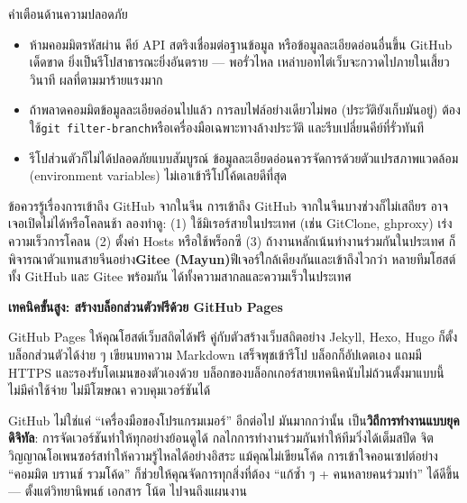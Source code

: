 \begin{tcbwarn}{คำเตือนด้านความปลอดภัย}
\begin{itemize}
  \item ห้ามคอมมิตรหัสผ่าน คีย์ API สตริงเชื่อมต่อฐานข้อมูล หรือข้อมูลละเอียดอ่อนอื่นขึ้น GitHub เด็ดขาด ยิ่งเป็นรีโปสาธารณะยิ่งอันตราย — พอรั่วไหล เหล่าบอทไต่เว็บจะกวาดไปภายในเสี้ยววินาที ผลที่ตามมาร้ายแรงมาก
  \item ถ้าพลาดคอมมิตข้อมูลละเอียดอ่อนไปแล้ว การลบไฟล์อย่างเดียวไม่พอ (ประวัติยังเก็บมันอยู่) ต้องใช้\texttt{git filter-\allowbreak branch}หรือเครื่องมือเฉพาะทางล้างประวัติ และรีบเปลี่ยนคีย์ที่รั่วทันที
  \item รีโปส่วนตัวก็ไม่ได้ปลอดภัยแบบสัมบูรณ์ ข้อมูลละเอียดอ่อนควรจัดการด้วยตัวแปรสภาพแวดล้อม (environment variables) ไม่เอาเข้ารีโปโค้ดเลยดีที่สุด
\end{itemize}

\end{tcbwarn}

\begin{tcbinfo}{ข้อควรรู้เรื่องการเข้าถึง GitHub จากในจีน}
การเข้าถึง GitHub จากในจีนบางช่วงก็ไม่เสถียร อาจเจอเปิดไม่ได้หรือโคลนช้า ลองทำดู: (1) ใช้มิเรอร์สายในประเทศ (เช่น GitClone, ghproxy) เร่งความเร็วการโคลน (2) ตั้งค่า Hosts หรือใช้พร็อกซี (3) ถ้างานหลักเน้นทำงานร่วมกันในประเทศ ก็พิจารณาตัวแทนสายจีนอย่าง\textbf{Gitee (Mayun)}ฟีเจอร์ใกล้เคียงกันและเข้าถึงไวกว่า หลายทีมโฮสต์ทั้ง GitHub และ Gitee พร้อมกัน ได้ทั้งความสากลและความเร็วในประเทศ

\end{tcbinfo}

\textbf{เทคนิคขั้นสูง: สร้างบล็อกส่วนตัวฟรีด้วย GitHub Pages}\par

GitHub Pages ให้คุณโฮสต์เว็บสถิตได้ฟรี คู่กับตัวสร้างเว็บสถิตอย่าง Jekyll, Hexo, Hugo ก็ตั้งบล็อกส่วนตัวได้ง่าย ๆ เขียนบทความ Markdown เสร็จพุชเข้ารีโป บล็อกก็อัปเดตเอง แถมมี HTTPS และรองรับโดเมนของตัวเองด้วย บล็อกของบล็อกเกอร์สายเทคนิคนับไม่ถ้วนตั้งมาแบบนี้ ไม่มีค่าใช้จ่าย ไม่มีโฆษณา ควบคุมเวอร์ชันได้


GitHub ไม่ใช่แค่ “เครื่องมือของโปรแกรมเมอร์” อีกต่อไป มันมากกว่านั้น เป็น\textbf{วิถีการทำงานแบบยุคดิจิทัล}: การจัดเวอร์ชันทำให้ทุกอย่างย้อนดูได้ กลไกการทำงานร่วมกันทำให้ทีมวิ่งได้เต็มสปีด จิตวิญญาณโอเพนซอร์สทำให้ความรู้ไหลได้อย่างอิสระ แม้คุณไม่เขียนโค้ด การเข้าใจคอนเซปต์อย่าง “คอมมิต บรานช์ รวมโค้ด” ก็ช่วยให้คุณจัดการทุกสิ่งที่ต้อง “แก้ซ้ำ ๆ + คนหลายคนร่วมทำ” ได้ดีขึ้น — ตั้งแต่วิทยานิพนธ์ เอกสาร โน้ต ไปจนถึงแผนงาน

